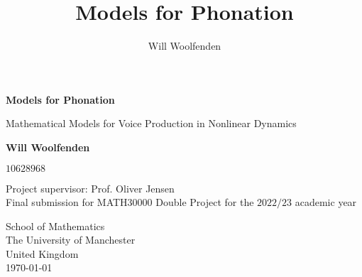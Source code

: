 \documentclass{report}
\title{Models for Phonation}
\author{Will Woolfenden}
\begin{document}
\begin{titlepage}
    \begin{center}
        \vspace*{1cm}
            
        \Huge
        \textbf{Models for Phonation}
            
        \vspace{0.5cm}
        \LARGE
        Mathematical Models for Voice Production in Nonlinear Dynamics
            
        \vspace{1.5cm}
            
        \textbf{Will Woolfenden}
        
        \vspace{0.5cm}
        
        $10628968$
            
        \vfill

        Project supervisor: Prof. Oliver Jensen \\

        \vspace{0.8cm}
        Final submission for MATH30000 Double Project for the $2022/23$ academic year
            
        \vspace{0.8cm}
            
        \Large

        School of Mathematics\\
        The University of Manchester\\
        United Kingdom\\
        \today
    \end{center}
\end{titlepage}
\end{document}
